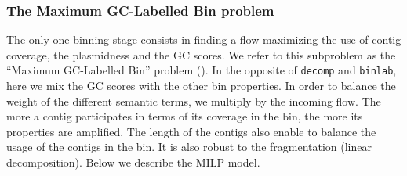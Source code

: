\subsubsection{The Maximum GC-Labelled Bin problem \MGCLB{}}\label{sec:pbf_iterbin:once:mgclb}

The only one binning stage consists in finding a flow maximizing the use of contig coverage, the plasmidness and the GC scores.
We refer to this subproblem as the \enquote{Maximum GC-Labelled Bin} problem (\MGCLB{}).
In the opposite of \texttt{decomp} and \texttt{binlab}, here we mix the GC scores with the other bin properties.
In order to balance the weight of the different semantic terms, we multiply by the incoming flow.
The more a contig participates in terms of its coverage in the bin, the more its properties are amplified.
The length of the contigs also enable to balance the usage of the contigs in the bin.
It is also robust to the fragmentation (linear decomposition).
Below we describe the MILP model.

